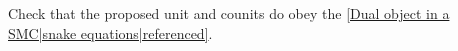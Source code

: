 
Check that the proposed unit and counits do obey the \ref{Dual object in a SMC|snake equations|referenced}.